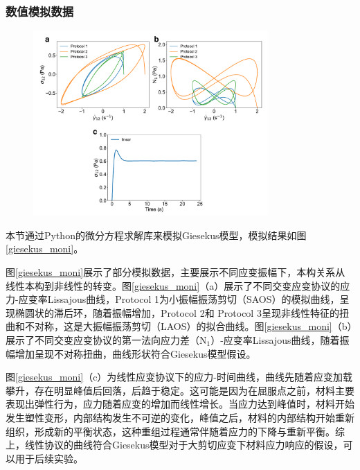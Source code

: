 \subsubsection{数值模拟数据}
\begin{figure}[htbp]
  \centering
  \includegraphics[width=0.8\textwidth]{Fig/giesekus-moni.pdf}
\end{figure}
本节通过Python的微分方程求解库来模拟Giesekus模型，模拟结果如图\ref{giesekus_moni}。

图\ref{giesekus_moni}展示了部分模拟数据，主要展示不同应变振幅下，本构关系从线性本构到非线性的转变。图\ref{giesekus_moni}（a）展示了不同交变应变协议的应力-应变率Lissajous曲线，Protocol 1为小振幅振荡剪切（SAOS）的模拟曲线，呈现椭圆状的滞后环，随着振幅增加，Protocol 2和 Protocol 3呈现非线性特征的扭曲和不对称，这是大振幅振荡剪切（LAOS）的拟合曲线。图\ref{giesekus_moni}（b）展示了不同交变应变协议的第一法向应力差（N$_1$）-应变率Lissajous曲线，随着振幅增加呈现不对称扭曲，曲线形状符合Giesekus模型假设\cite{lennonScientificMachineLearning2023a}。

图\ref{giesekus_moni}（c）为线性应变协议下的应力-时间曲线，曲线先随着应变加载攀升，存在明显峰值后回落，后趋于稳定。这可能是因为在屈服点之前，材料主要表现出弹性行为，应力随着应变的增加而线性增长。当应力达到峰值时，材料开始发生塑性变形，内部结构发生不可逆的变化，峰值之后，材料的内部结构开始重新组织，形成新的平衡状态，这种重组过程通常伴随着应力的下降与重新平衡。综上，线性协议的曲线符合Giesekus模型对于大剪切应变下材料应力响应的假设，可以用于后续实验。

